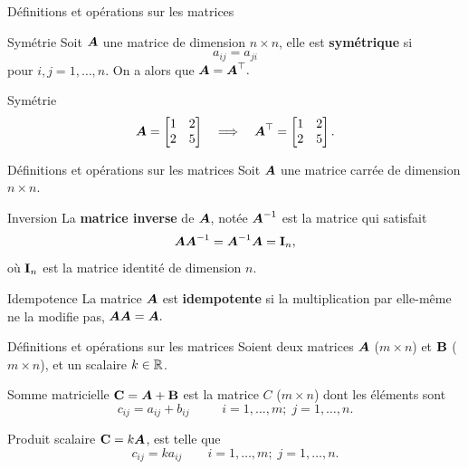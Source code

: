 \documentclass{BeamerAAV}
\begin{document}
\begin{frame}{Définitions et opérations sur les matrices}
 \begin{bte}{Symétrie}
      Soit $\mbox{\boldmath$A$\unboldmath}$ une matrice de dimension $n\times n$, elle est \textbf{symétrique} si 
    $$ a_{ij} = a_{ji}$$
    pour $i, j = 1, \dots, n$. On a alors que $\mbox{\boldmath$A$\unboldmath} = \mbox{\boldmath$A$\unboldmath}^\top.$
    \end{bte}
\begin{exe}{Symétrie}
    \[
\mbox{\boldmath$A$\unboldmath}=
\begin{bmatrix}
1&2\\2&5
\end{bmatrix}
\quad\Longrightarrow\quad
\mbox{\boldmath$A$\unboldmath}^\top=
\begin{bmatrix}
1&2\\2&5
\end{bmatrix}.
\]
\end{exe}
\end{frame}


   
\begin{frame}{Définitions et opérations sur les matrices}
Soit $\mbox{\boldmath$A$\unboldmath}$ une matrice carrée de dimension $n\times n$.
    \begin{bte}{Inversion}
      La \textbf{matrice inverse} de $\mbox{\boldmath$A$\unboldmath}$, notée $\mbox{\boldmath$A$\unboldmath}^{-1}$ est la matrice qui satisfait
    $$ \mbox{\boldmath$A$\unboldmath} \mbox{\boldmath$A$\unboldmath}^{-1} = \mbox{\boldmath$A$\unboldmath}^{-1}\mbox{\boldmath$A$\unboldmath} = \bold{I}_n,$$
    où $\bold{I}_n$ est la matrice identité de dimension $n$.
    \end{bte}
    \begin{bte}{Idempotence}
      La matrice $\mbox{\boldmath$A$\unboldmath}$ est \textbf{idempotente} si la multiplication par elle-même ne la modifie pas,  
     $\mbox{\boldmath$A$\unboldmath} \mbox{\boldmath$A$\unboldmath} = \mbox{\boldmath$A$\unboldmath}.$
    \end{bte}
\end{frame}

\begin{frame}{Définitions et opérations sur les matrices}
Soient deux matrices $\mbox{\boldmath$A$\unboldmath}$ ($m\times n$) et $\bold B$ ($m\times n$), et un scalaire $k\in\mathbb{R}$.
\begin{bte}{Somme matricielle}
    $\bold{C}=\mbox{\boldmath$A$\unboldmath}+\bold B$ est la matrice $C$ ($m\times n$) dont les éléments sont
$$c_{ij}=a_{ij}+b_{ij}\qquad\;\;i=1,\ldots,m; \; j=1,\ldots,n.$$
\end{bte}
\begin{bte}{Produit scalaire}
   $\bold{C}=k\mbox{\boldmath$A$\unboldmath}$, est telle que
$$c_{ij}=k a_{ij}\qquad i=1,\ldots,m; \; j=1,\ldots,n.$$
\end{bte}
\end{frame}
\end{document}
